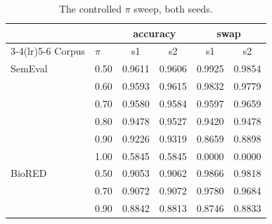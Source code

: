 \documentclass[11pt]{article}
\begin{document}
\begin{table}[h]
\centering\small
\begin{tabular}{llcccc}
\toprule
 & & \multicolumn{2}{c}{accuracy} & \multicolumn{2}{c}{swap} \\
\cmidrule(lr){3-4}\cmidrule(lr){5-6}
Corpus & $\pi$ & s1 & s2 & s1 & s2 \\
\midrule
SemEval & 0.50 & 0.9611 & 0.9606 & 0.9925 & 0.9854 \\
        & 0.60 & 0.9593 & 0.9615 & 0.9832 & 0.9779 \\
        & 0.70 & 0.9580 & 0.9584 & 0.9597 & 0.9659 \\
        & 0.80 & 0.9478 & 0.9527 & 0.9420 & 0.9478 \\
        & 0.90 & 0.9226 & 0.9319 & 0.8659 & 0.8898 \\
        & 1.00 & 0.5845 & 0.5845 & 0.0000 & 0.0000 \\
\midrule
BioRED  & 0.50 & 0.9053 & 0.9062 & 0.9866 & 0.9818 \\
        & 0.70 & 0.9072 & 0.9072 & 0.9780 & 0.9684 \\
        & 0.90 & 0.8842 & 0.8813 & 0.8746 & 0.8833 \\
\bottomrule
\end{tabular}
\caption{The controlled $\pi$ sweep, both seeds.}
\label{tab:seedssweep}
\end{table}
\end{document}
